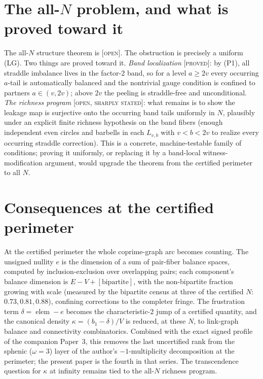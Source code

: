 \documentclass[11pt,reqno]{amsart}
\theoremstyle{plain}
\theoremstyle{definition}
\theoremstyle{plain}
\theoremstyle{definition}
\newcommand{\elem}{\operatorname{elem}}
\newcommand{\dd}{\delta}
\newcommand{\st}{\textsc}
\begin{document}
\section{The all-$N$ problem, and what is proved toward it}\label{sec:allN}

The all-$N$ structure theorem is \st{[open]}. The obstruction is precisely a uniform (LG). Two
things are proved toward it. \emph{Band localization} \st{[proved]}: by (P1), all straddle
imbalance lives in the factor-$2$ band, so for a level $a\ge2v$ every occurring $a$-tail is
automatically balanced and the nontrivial gauge condition is confined to partners $a\in(v,2v)$;
above $2v$ the peeling is straddle-free and unconditional. \emph{The richness program}
\st{[open, sharply stated]}: what remains is to show the leakage map is surjective onto the
occurring band tails uniformly in $N$, plausibly under an explicit finite richness hypothesis on
the band fibers (enough independent even circles and barbells in each $L_{v,b}$ with $v<b<2v$ to
realize every occurring straddle correction). This is a concrete, machine-testable family of
conditions; proving it uniformly, or replacing it by a band-local witness-modification argument,
would upgrade the theorem from the certified perimeter to all $N$.

\section{Consequences at the certified perimeter}\label{sec:conseq}

At the certified perimeter the whole coprime-graph arc becomes counting. The unsigned nullity
$e$ is the dimension of a sum of pair-fiber balance spaces, computed by inclusion-exclusion over
overlapping pairs; each component's balance dimension is $E-V+[\text{bipartite}]$, with the
non-bipartite fraction growing with scale (measured by the bipartite census at three of the
certified $N$: $0.73,0.81,0.88$), confining corrections to the completer fringe. The frustration
term $\dd=\elem-e$ becomes the characteristic-$2$ jump of a certified quantity, and the canonical
density $\kappa=(b_1-\dd)/V$ is reduced, at these $N$, to link-graph balance and connectivity
combinatorics. Combined with the exact signed profile of the companion Paper~3, this removes
the last uncertified rank from the sphenic ($\omega=3$) layer of the author's
$-1$-multiplicity decomposition \cite{Rich2026a,Rich2026b} at the perimeter; the present paper
is the fourth in that series.
The transcendence question for $\kappa$ at infinity remains tied to the all-$N$ richness program.
\end{document}
